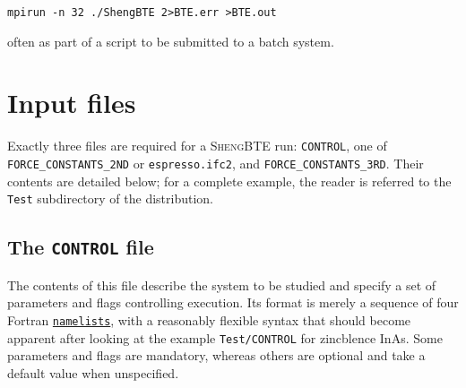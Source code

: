 \documentclass[a4paper,10pt,english]{article}
\begin{document}
\begin{verbatim}
mpirun -n 32 ./ShengBTE 2>BTE.err >BTE.out
\end{verbatim}

\noindent often as part of a script to be submitted to a batch system.

\section{Input files}

Exactly three files are required for a \textsc{ShengBTE} run: \texttt{CONTROL}, one of \texttt{FORCE\_CONSTANTS\_2ND} or \texttt{espresso.ifc2}, and \texttt{FORCE\_CONSTANTS\_3RD}. Their contents are detailed below; for a complete example, the reader is referred to the \texttt{Test} subdirectory of the distribution.

\subsection{The \texttt{CONTROL} file}

The contents of this file describe the system to be studied and specify a set of parameters and flags controlling execution. Its format is merely a sequence of four Fortran \href{http://publib.boulder.ibm.com/infocenter/lnxpcomp/v8v101/index.jsp?topic=%2Fcom.ibm.xlf101l.doc%2Fxlflr%2Fnamelistio.htm}{\nolinkurl{namelists}}, with a reasonably flexible syntax that should become apparent after looking at the example \texttt{Test/CONTROL} for zincblence InAs. Some parameters and flags are mandatory, whereas others are optional and take a default value when unspecified.
\end{document}
